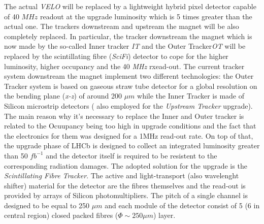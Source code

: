 \documentclass[paper=a4, fontsize=10pt]{scrartcl}
\numberwithin{equation}{section}		%
\numberwithin{figure}{section}			%
\numberwithin{table}{section}				%
\begin{document}
The actual \textit{VELO} will be replaced by a lightweight hybrid pixel detector capable of 40 $MHz$ readout at the upgrade luminosity which is 5 times greater than the actual one.
The trackers downstream and upstream the magnet will be also completely replaced. In particular, the tracker downstream the magnet which is now made by the so-called Inner tracker \textit{IT} and the Outer Tracker\textit{OT} will be replaced by the scintillating fibre (\textit{SciFi}) detector to cope for the higher luminosity, higher occupancy and the 40 \textit{MHz} rxead-out.
The current tracker system downstream the magnet implement two different technologies: the Outer Tracker system is based on gaseous straw tube detector for a global resolution on the bending plane (\textit{x-z}) of around 200 $\mu m$ while the Inner Tracker is made of Silicon microstrip detectors ( also employed for the \textit{Upstream Tracker} upgrade).
The main reason why it's necessary to replace the Inner and Outer tracker is related to the Ocuupancy being too high in upgrade conditions and the fact that the electronics for them was designed for a 1MHz read-out rate. On top of that, the upgrade phase of LHCb is designed to collect an integrated luminosity greater than 50 $fb^{-1}$ and the detector itself is required to be resistent to the corresponding radiation damages.
The adopted solution for the upgrade is the \textit{Scintillating Fibre Tracker}. The active and light-transport (also wavelenght shifter) material for the detector are the fibres themselves and the read-out is provided by arrays of Silicon photomultipliers. The pitch of a single channel is designed to be equal to 250 $\mu m$ and each module of the detector consist of 5 (6 in central region) closed packed fibres ($\Phi \sim 250 \mu m$) layer.
\end{document}
